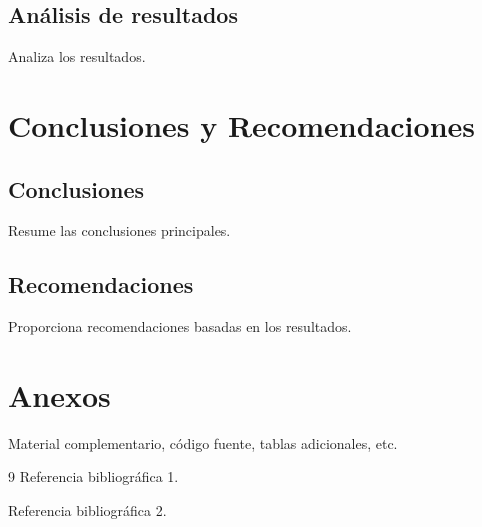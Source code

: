 \documentclass[12pt, a4paper]{report}
\begin{document}
\section{Análisis de resultados}
Analiza los resultados.

\chapter{Conclusiones y Recomendaciones}

\section{Conclusiones}
Resume las conclusiones principales.

\section{Recomendaciones}
Proporciona recomendaciones basadas en los resultados.

\appendix

\chapter{Anexos}

Material complementario, código fuente, tablas adicionales, etc.

\begin{thebibliography}{9}
Referencia bibliográfica 1.

Referencia bibliográfica 2.
\end{thebibliography}
\end{document}
